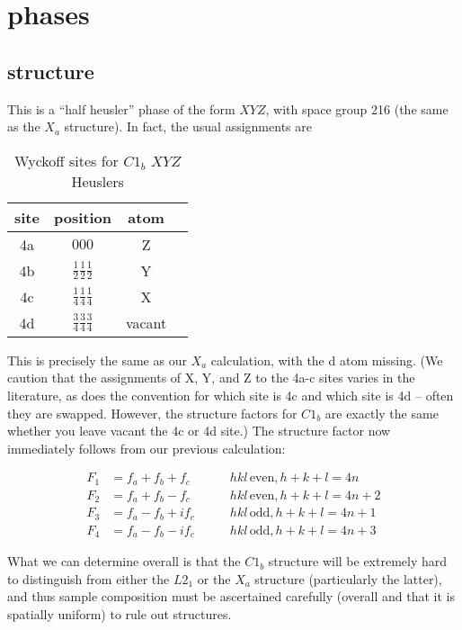 \documentclass[aps,amsmath,amssymb,prb,superscriptaddress,longtable,preprint,fleqn]{revtex4}
\begin{document}
\section{ phases}

\subsection{ structure}

This is a ``half heusler'' phase of the form $XYZ$, with space group 216 (the same as the $X_a$ structure). In fact, the usual assignments are 

\begin{table}[htdp]
\begin{center}
\caption{Wyckoff sites for $C1_b$ $XYZ$ Heuslers}
\begin{tabular}{cccc}
site & position & atom \\
\hline
4a & $000$ & Z & \\
4b & $\frac{1}{2}\frac{1}{2}\frac{1}{2}$ & Y \\
4c & $\frac{1}{4}\frac{1}{4}\frac{1}{4}$ & X\\
4d & $\frac{3}{4}\frac{3}{4}\frac{3}{4}$ & vacant
\end{tabular}
\end{center}
\label{wyckoff.c1b}
\end{table}%

This is precisely the same as our $X_a$ calculation, with the d atom missing. (We caution that the assignments of X, Y, and Z to the 4a-c sites varies in the literature, as does the convention for which site is 4c and which site is 4d -- often they are swapped. However, the structure factors for $C1_b$ are exactly the same whether you leave vacant the 4c or 4d site.) The structure factor now immediately follows from our previous calculation:

\begin{align}
F_1 &= f_a+ f_b + f_c \qquad &hkl\,\text{even}, h+k+l = 4n\\
F_2 &= f_a+ f_b - f_c \qquad &hkl\,\text{even}, h+k+l = 4n+2\\
F_3 &= f_a - f_b + if_c \qquad &hkl\,\text{odd}, h+k+l = 4n+1\\
F_4 &= f_a - f_b - if_c \qquad &hkl\,\text{odd}, h+k+l = 4n+3
\end{align}

What we can determine overall is that the $C1_b$ structure will be extremely hard to distinguish from either the $L2_1$ or the $X_a$ structure (particularly the latter), and thus sample composition must be ascertained carefully (overall and that it is spatially uniform) to rule out structures. 
\end{document}

